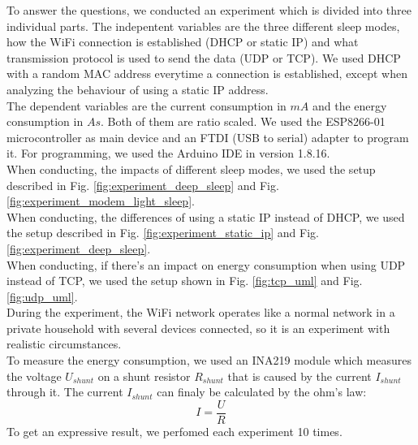 To answer the questions, we conducted an experiment which is divided into three individual parts.
The indepentent variables are the three different sleep modes, how the WiFi connection is established (DHCP or static IP) and what transmission protocol is used to send the data (UDP or TCP).
We used DHCP with a random MAC address everytime a connection is established, except when analyzing the behaviour of using a static IP address.\\
The dependent variables are the current consumption in $mA$ and the energy consumption in $As$. Both of them are ratio scaled.
We used the ESP8266-01 microcontroller as main device and an FTDI (USB to serial) adapter to program it. 
For programming, we used the Arduino IDE in version 1.8.16.\\
When conducting, the impacts of different sleep modes, we used the setup described in Fig. \ref{fig:experiment_deep_sleep} and Fig. \ref{fig:experiment_modem_light_sleep}.\\
When conducting, the differences of using a static IP instead of DHCP, we used the setup described in Fig. \ref{fig:experiment_static_ip} and Fig. \ref{fig:experiment_deep_sleep}.\\
When conducting, if there's an impact on energy consumption when using UDP instead of TCP, we used the setup shown in Fig. \ref{fig:tcp_uml} and Fig. \ref{fig:udp_uml}.\\
During the experiment, the WiFi network operates like a normal network in a private household with several devices connected, so it is an experiment with realistic circumstances.\\

To measure the energy consumption, we used an INA219 module which measures the voltage $U_{shunt}$ on a shunt resistor $R_{shunt}$ that is caused by the current $I_{shunt}$ through it.
The current $I_{shunt}$ can finaly be calculated by the ohm's law:
\begin{equation*}
    I = \frac{U}{R}
\end{equation*}
To get an expressive result, we perfomed each experiment 10 times.





